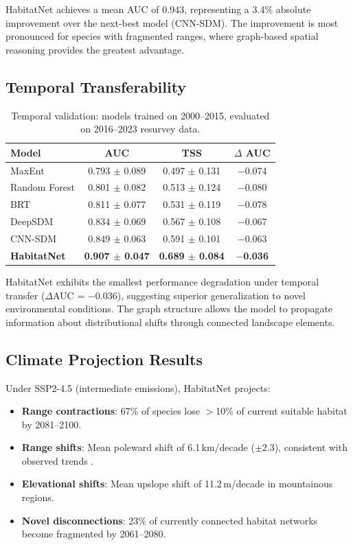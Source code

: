 \documentclass[11pt,a4paper]{article}
\begin{document}
HabitatNet achieves a mean AUC of 0.943, representing a 3.4\% absolute
improvement over the next-best model (CNN-SDM). The improvement is most
pronounced for species with fragmented ranges, where graph-based spatial
reasoning provides the greatest advantage.

\subsection{Temporal Transferability}

\begin{table}[H]
\centering
\caption{Temporal validation: models trained on 2000--2015, evaluated on
2016--2023 resurvey data.}
\label{tab:temporal}
\begin{tabular}{lccc}
\toprule
\textbf{Model} & \textbf{AUC} & \textbf{TSS} & \textbf{$\Delta$ AUC} \\
\midrule
MaxEnt          & 0.793 $\pm$ 0.089 & 0.497 $\pm$ 0.131 & $-$0.074 \\
Random Forest   & 0.801 $\pm$ 0.082 & 0.513 $\pm$ 0.124 & $-$0.080 \\
BRT             & 0.811 $\pm$ 0.077 & 0.531 $\pm$ 0.119 & $-$0.078 \\
DeepSDM         & 0.834 $\pm$ 0.069 & 0.567 $\pm$ 0.108 & $-$0.067 \\
CNN-SDM         & 0.849 $\pm$ 0.063 & 0.591 $\pm$ 0.101 & $-$0.063 \\
\textbf{HabitatNet} & \textbf{0.907 $\pm$ 0.047} & \textbf{0.689 $\pm$ 0.084} & $-$\textbf{0.036} \\
\bottomrule
\end{tabular}
\end{table}

HabitatNet exhibits the smallest performance degradation under temporal
transfer ($\Delta$AUC = $-$0.036), suggesting superior generalization to
novel environmental conditions. The graph structure allows the model to
propagate information about distributional shifts through connected
landscape elements.

\subsection{Climate Projection Results}

Under SSP2-4.5 (intermediate emissions), HabitatNet projects:
\begin{itemize}
  \item \textbf{Range contractions}: 67\% of species lose $>$10\% of
    current suitable habitat by 2081--2100.
  \item \textbf{Range shifts}: Mean poleward shift of 6.1\,km/decade
    ($\pm$2.3), consistent with observed trends
    \citep{chen2011rapid}.
  \item \textbf{Elevational shifts}: Mean upslope shift of 11.2\,m/decade
    in mountainous regions.
  \item \textbf{Novel disconnections}: 23\% of currently connected
    habitat networks become fragmented by 2061--2080.
\end{itemize}
\end{document}
